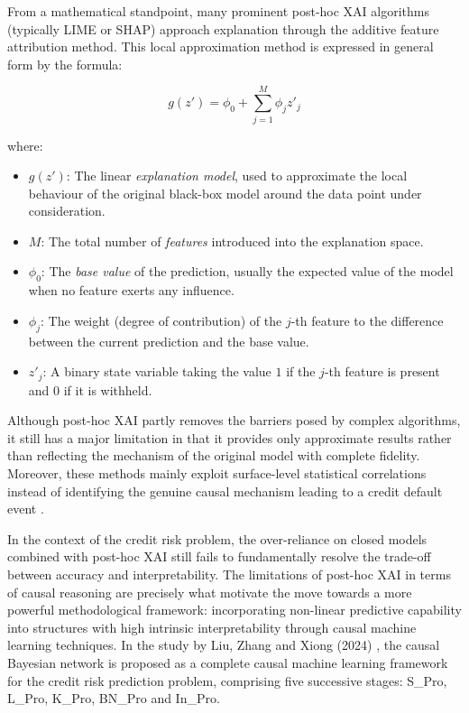 From a mathematical standpoint, many prominent post-hoc XAI algorithms (typically LIME or SHAP) approach explanation through the additive feature attribution method. This local approximation method is expressed in general form by the formula:

\begin{equation}
g(z') = \phi_0 + \sum_{j=1}^{M} \phi_j z'_j
\end{equation}

\noindent
where:
\begin{itemize}
    \item[-] $g(z')$: The linear \textit{explanation model}, used to approximate the local behaviour of the original black-box model around the data point under consideration.
    \item[-] $M$: The total number of \textit{features} introduced into the explanation space.
    \item[-] $\phi_0$: The \textit{base value} of the prediction, usually the expected value of the model when no feature exerts any influence.
    \item[-] $\phi_j$: The weight (degree of contribution) of the $j$-th feature to the difference between the current prediction and the base value.
    \item[-] $z'_j$: A binary state variable taking the value $1$ if the $j$-th feature is present and $0$ if it is withheld.
\end{itemize}

\vspace{0.8em}
Although post-hoc XAI partly removes the barriers posed by complex algorithms, it still has a major limitation in that it provides only approximate results rather than reflecting the mechanism of the original model with complete fidelity. Moreover, these methods mainly exploit surface-level statistical correlations instead of identifying the genuine causal mechanism leading to a credit default event \cite{liu2024credit}.

In the context of the credit risk problem, the over-reliance on closed models combined with post-hoc XAI still fails to fundamentally resolve the trade-off between accuracy and interpretability. The limitations of post-hoc XAI in terms of causal reasoning are precisely what motivate the move towards a more powerful methodological framework: incorporating non-linear predictive capability into structures with high intrinsic interpretability through causal machine learning techniques. In the study by Liu, Zhang and Xiong (2024) \cite{liu2024credit}, the causal Bayesian network is proposed as a complete causal machine learning framework for the credit risk prediction problem, comprising five successive stages: S\_Pro, L\_Pro, K\_Pro, BN\_Pro and In\_Pro.


